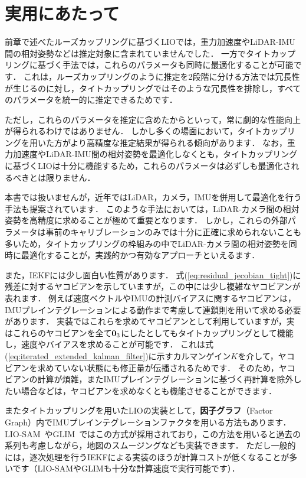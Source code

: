 \section{実用にあたって}

前章で述べたルーズカップリングに基づくLIOでは，重力加速度やLiDAR-IMU間の相対姿勢などは推定対象に含まれていませんでした．
一方でタイトカップリングに基づく手法では，これらのパラメータも同時に最適化することが可能です．
これは，ルーズカップリングのように推定を2段階に分ける方法では冗長性が生じるのに対し，タイトカップリングではそのような冗長性を排除し，すべてのパラメータを統一的に推定できるためです．

ただし，これらのパラメータを推定に含めたからといって，常に劇的な性能向上が得られるわけではありません．
しかし多くの場面において，タイトカップリングを用いた方がより高精度な推定結果が得られる傾向があります．
なお，重力加速度やLiDAR-IMU間の相対姿勢を最適化しなくとも，タイトカップリングに基づくLIOは十分に機能するため，これらのパラメータは必ずしも最適化されるべきとは限りません．

本書では扱いませんが，近年ではLiDAR，カメラ，IMUを併用して最適化を行う手法も提案されています．
このような手法においては，LiDAR-カメラ間の相対姿勢を高精度に求めることが極めて重要となります．
しかし，これらの外部パラメータは事前のキャリブレーションのみでは十分に正確に求められないことも多いため，タイトカップリングの枠組みの中でLiDAR-カメラ間の相対姿勢を同時に最適化することが，実践的かつ有効なアプローチといえるます．

また，IEKFには少し面白い性質があります．
式(\ref{eq:residual_jecobian_tight})に残差に対するヤコビアンを示していますが，この中には少し複雑なヤコビアンが表れます．
例えば速度ベクトルやIMUの計測バイアスに関するヤコビアンは，IMUプレインテグレーションによる動作まで考慮して連鎖則を用いて求める必要があります．
実装ではこれらを求めてヤコビアンとして利用していますが，実はこれらのヤコビアンを全て${\bf 0}_{3}$にしたとしてもタイトカップリングとして機能し，速度やバイアスを求めることが可能です．
これは式(\ref{eq:iterated_extended_kalman_filter})に示すカルマンゲイン$K$を介して，ヤコビアンを求めていない状態にも修正量が伝播されるためです．
そのため，ヤコビアンの計算が煩雑，またIMUプレインテグレーションに基づく再計算を除外したい場合などは，ヤコビアンを求めなくとも機能させることができます．

またタイトカップリングを用いたLIOの実装として，{\bf 因子グラフ}（Factor Graph）内でIMUプレインテグレーションファクタを用いる方法もあります．
LIO-SAM~\cite{liosam2020shan}やGLIM~\cite{KoideRAS2024}ではこの方式が採用されており，この方法を用いると過去の系列も考慮しながら，地図のスムージングなども実装できます．
ただし一般的には，逐次処理を行うIEKFによる実装のほうが計算コストが低くなることが多いです（LIO-SAMやGLIMも十分な計算速度で実行可能です）．









